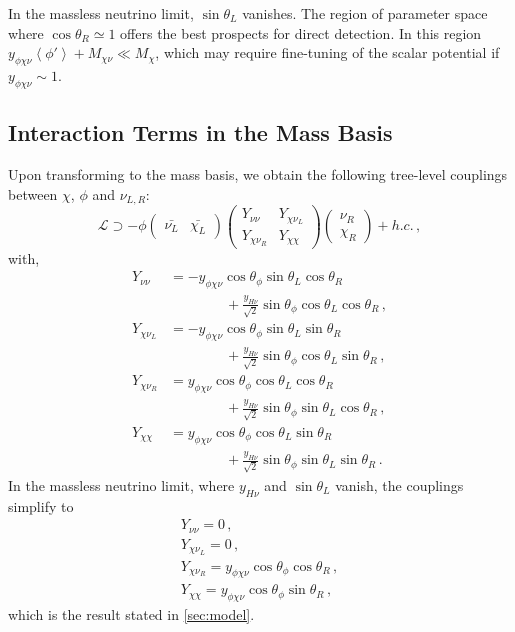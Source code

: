 \documentclass[aps, prd, reprint, nofootinbib, amsmath, amssymb, floatfix]{revtex4-2}
\newcommand{\vev}[1]{\left< #1 \right>}      %
\begin{document}
In the massless neutrino limit, $\sin\theta_L$ vanishes. The region of parameter space where $\cos\theta_R \simeq 1$ offers the best prospects for direct detection. In this region $y_{\phi\chi\nu}\vev{\phi'} + M_{\chi\nu} \ll M_\chi$, which may require fine-tuning of the scalar potential if $y_{\phi\chi\nu} \sim 1$.


\subsection{Interaction Terms in the Mass Basis}

Upon transforming to the mass basis, we obtain the following tree-level couplings between $\chi$, $\phi$ and $\nu_{L,R}$:
%
\begin{equation}
    \mathcal{L} \supset -\phi
    \begin{pmatrix}
        \bar{\nu_L} & \bar{\chi_L} 
    \end{pmatrix}
    \begin{pmatrix}
        Y_{\nu\nu} & Y_{\chi\nu_L} \\
        Y_{\chi\nu_R} & Y_{\chi\chi}
    \end{pmatrix}
    \begin{pmatrix}
        \nu_R \\ \chi_R
    \end{pmatrix} + h.c. \,,
\end{equation}
%
with,
%
\begin{align}
    Y_{\nu\nu} &= - y_{\phi\chi\nu}\cos\theta_\phi \sin\theta_L\cos\theta_R \nonumber\\ 
    & \quad\quad\quad\quad + \frac{y_{H\nu}}{\sqrt{2}}\sin\theta_\phi \cos\theta_L\cos\theta_R \,, \\
    Y_{\chi\nu_L} &= - y_{\phi\chi\nu}\cos\theta_\phi \sin\theta_L\sin\theta_R \nonumber\\ 
    & \quad\quad\quad\quad + \frac{y_{H\nu}}{\sqrt{2}}\sin\theta_\phi \cos\theta_L\sin\theta_R \,, \\
    Y_{\chi\nu_R} &= y_{\phi\chi\nu}\cos\theta_\phi \cos\theta_L\cos\theta_R \nonumber\\ 
    & \quad\quad\quad\quad + \frac{y_{H\nu}}{\sqrt{2}}\sin\theta_\phi \sin\theta_L\cos\theta_R \,, \\
    Y_{\chi\chi} &= y_{\phi\chi\nu}\cos\theta_\phi \cos\theta_L\sin\theta_R \nonumber\\ 
    & \quad\quad\quad\quad + \frac{y_{H\nu}}{\sqrt{2}}\sin\theta_\phi \sin\theta_L\sin\theta_R \,.
\end{align} 
%
In the massless neutrino limit, where $y_{H\nu}$ and $\sin\theta_L$ vanish, the couplings simplify to
%
\begin{gather}
    Y_{\nu\nu} = 0 \,, \\
    Y_{\chi\nu_L} = 0 \,, \\
    Y_{\chi\nu_R} = y_{\phi\chi\nu}\cos\theta_\phi \cos\theta_R \,, \\
    Y_{\chi\chi} = y_{\phi\chi\nu}\cos\theta_\phi \sin\theta_R \,,
\end{gather}
%
which is the result stated in \cref{sec:model}.
\end{document}
